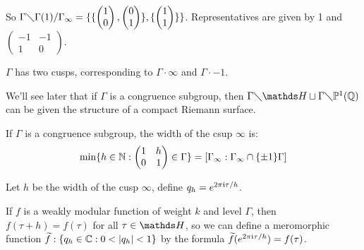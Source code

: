 \documentclass[10pt,a4paper]{article}
\begin{document}
So $\Gamma\diagdown \Gamma(1)/\Gamma_\infty = \{\{\begin{pmatrix}1\\0\end{pmatrix}, \begin{pmatrix}0\\1\end{pmatrix}\}, \{\begin{pmatrix}1\\1\end{pmatrix}\}\}$. Representatives are given by 1 and $\begin{pmatrix}-1 & -1 \\ 1 & 0 \end{pmatrix}$.

$\Gamma$ has two cusps, corresponding to $\Gamma \cdot \infty$ and $\Gamma \cdot -1$.

We'll see later that if $\Gamma$ is a congruence subgroup, then $\Gamma \diagdown \H \sqcup \Gamma \diagdown \P^1(\Q)$ can be given the structure of a compact Riemann surface.

\begin{definition}
  If $\Gamma$ is a congruence subgroup, the width of the csup $\infty$ is:
  \[\min\{h \in \mathbb{N}:\begin{pmatrix}1&h\\0&1\end{pmatrix} \in \Gamma\} = [\Gamma_\infty:\Gamma_\infty \cap \{\pm 1\}\Gamma]\]

\end{definition}
Let $h$ be the width of the cusp $\infty$, define $q_h = e^{2\pi\mathfrak{i}\tau/h}$.

If $f$ is a weakly modular function of weight $k$ and level $\Gamma$, then $f(\tau+h) = f(\tau)$ for all $\tau \in \H$, so we can define a meromorphic function $\tilde{f}:\{q_h \in \C: 0 <|q_h| < 1\}$ by the formula $\widetilde{f}(e^{2\pi\mathfrak{i}\tau/h}) = f(\tau)$.
\end{document}
